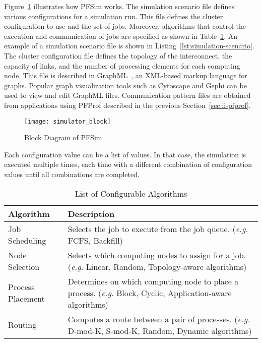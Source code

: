 Figure~\ref{fig:simulator-block} illustrates how PFSim works. The
simulation scenario file defines various configurations for a simulation
run. This file defines the cluster configuration to use and the set of
jobs. Moreover, algorithms that control the execution and communication
of jobs are specified as shown in Table~\ref{tbl:simulator-algorithm}.
An example of a simulation scenario file is shown in
Listing~\ref{lst:simulation-scenario}. The cluster configuration file
defines the topology of the interconnect, the capacity of links, and the
number of processing elements for each computing node. This file is
described in GraphML~\autocite{Brandes2013}, an XML-based markup
language for graphs. Popular graph visualization tools such as Cytoscape
and Gephi can be used to view and edit GraphML files. Communication
pattern files are obtained from applications using PFProf described in
the previous Section~\ref{sec:ii-pfprof}.

\begin{figure}
    \centering
    \texttt{[image: simulator\_block]}
    \caption{Block Diagram of PFSim}%
    \label{fig:simulator-block}
\end{figure}

Each configuration value can be a list of values. In that case, the
simulation is executed multiple times, each time with a different
combination of configuration values until all combinations are
completed.

\begin{table}
    \centering
    \normalsize
    \caption{List of Configurable Algorithms}%
    \label{tbl:simulator-algorithm}
    \begin{tabularx}{\linewidth}{lX}
        \toprule
        Algorithm         & Description                                                 \\
        \midrule
        Job Scheduling    & Selects the job to execute from the job queue.
                            (\emph{e.g.} FCFS, Backfill)                                \\
        Node Selection    & Selects which computing nodes to assign for a job.
                            (\emph{e.g.} Linear, Random, Topology-aware algorithms)     \\
        Process Placement & Determines on which computing node to place a process.
                            (\emph{e.g.} Block, Cyclic, Application-aware algorithms)   \\
        Routing           & Computes a route between a pair of processes.
                            (\emph{e.g.} D-mod-K, S-mod-K, Random, Dynamic algorithms)  \\
        \bottomrule
    \end{tabularx}
\end{table}

